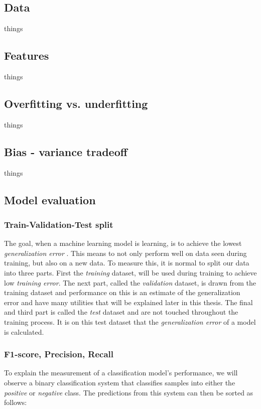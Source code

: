     \subsection{Data}
        things
    \subsection{Features}
        things
    \subsection{Overfitting vs. underfitting}
        things
    \subsection{Bias - variance tradeoff}
        things
        
    \subsection{Model evaluation}
    \subsubsection{Train-Validation-Test split}
        The goal, when a machine learning model is learning, is to achieve the lowest \textit{generalization error} \cite{Goodfellow-et-al-2016_generalization}. This means to not only perform well on data seen during training, but also on a new data. To measure this, it is normal to split our data into three parts\cite{Goodfellow-et-al-2016_train_val_test_split}. First the \textit{training} dataset, will be used during training to achieve low  \textit{training error}. The next part, called the \textit{validation} dataset, is drawn from the training dataset and performance on this is an estimate of the generalization error and have many utilities that will be explained later in this thesis. The final and third part is called the \textit{test} dataset and are not touched throughout the training process. It is on this test dataset that the \textit{generalization error} of a model is calculated.
        
    \subsubsection{F1-score, Precision, Recall} \label{f1_score}
        To explain the measurement of a classification model's performance, we will observe a binary classification system that classifies samples into either the \textit{positive} or \textit{negative} class\cite{powers2020evaluation_f1_recall_precision}. The predictions from this system can then be sorted as follows:
        
